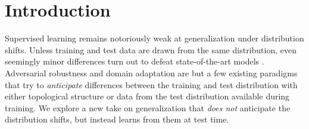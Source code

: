 \documentclass{article}
\theoremstyle{plain}
\theoremstyle{remark}
\theoremstyle{definition}
\begin{document}

\printAffiliationsAndNotice{} 

\begin{abstract}
In this paper, we propose Test-Time Training, a general approach for improving the performance of predictive models when training and test data come from different distributions. We turn a single unlabeled test sample into a self-supervised learning problem, on which we update the model parameters before making a prediction. This also extends naturally to data in an online stream. Our simple approach leads to improvements on diverse image classification benchmarks aimed at evaluating robustness to distribution shifts.
\end{abstract}

\section{Introduction}
\label{intro}

Supervised learning remains notoriously weak at generalization under distribution shifts.
Unless training and test data are drawn from the same distribution, even seemingly minor differences turn out to defeat state-of-the-art models \citep{recht2018cifar}.
Adversarial robustness and domain adaptation are but a few existing paradigms that try to \textit{anticipate} differences between the training and test distribution with either topological structure or data from the test distribution available during training.
We explore a new take on generalization that \textit{does not} anticipate the distribution shifts, but instead learns from them at test time.
\end{document}
